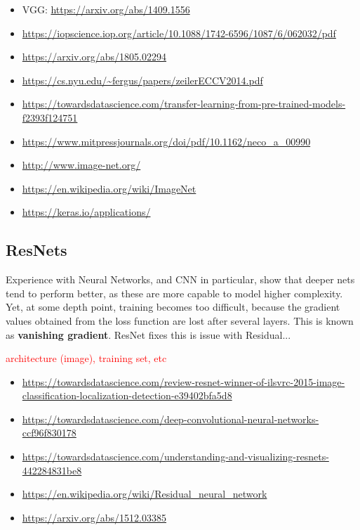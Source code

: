 \begin{itemize}
	\item VGG: \url{https://arxiv.org/abs/1409.1556}
	\item \url{https://iopscience.iop.org/article/10.1088/1742-6596/1087/6/062032/pdf}
	\item \url{https://arxiv.org/abs/1805.02294}
	\item \url{https://cs.nyu.edu/~fergus/papers/zeilerECCV2014.pdf}
	\item \url{https://towardsdatascience.com/transfer-learning-from-pre-trained-models-f2393f124751}
	\item \url{https://www.mitpressjournals.org/doi/pdf/10.1162/neco_a_00990}
	\item \url{http://www.image-net.org/}
	\item \url{https://en.wikipedia.org/wiki/ImageNet}
	\item \url{https://keras.io/applications/}
\end{itemize}

\subsection{ResNets}

Experience with Neural Networks, and CNN in particular, show that deeper nets tend to perform better, as these are more capable to model higher complexity. Yet, at some depth point, training becomes too difficult, because the gradient values obtained from the loss function are lost after several layers. This is known as \textbf{vanishing gradient}. ResNet fixes this is issue with Residual...

\textcolor{red}{architecture (image), training set, etc}

\begin{itemize}
	\item \url{https://towardsdatascience.com/review-resnet-winner-of-ilsvrc-2015-image-classification-localization-detection-e39402bfa5d8}
	\item \url{https://towardsdatascience.com/deep-convolutional-neural-networks-ccf96f830178}
	\item \url{https://towardsdatascience.com/understanding-and-visualizing-resnets-442284831be8}
	\item \url{https://en.wikipedia.org/wiki/Residual_neural_network}
	\item \url{https://arxiv.org/abs/1512.03385}
\end{itemize}

